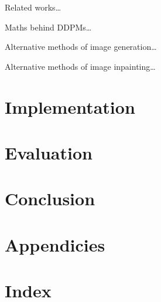 \documentclass{article}
\begin{document}
Related works\dots

Maths behind DDPMs\dots

Alternative methods of image generation\dots

Alternative methods of image inpainting\dots


\newpage
\section{Implementation}
\newpage
\section{Evaluation}
\newpage
\section{Conclusion}
\newpage
\printbibliography
\newpage
\section*{Appendicies}
\newpage
\section*{Index}
\newpage
\end{document}
